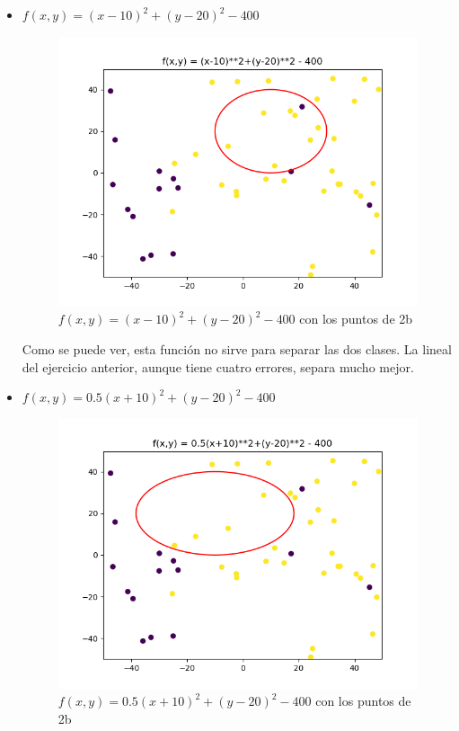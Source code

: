 \begin{itemize}
	\item $f(x,y) = (x-10)^2+(y-20)^2-400$
	
	\begin{figure}[H] %
		\centering
		\includegraphics[scale=0.5]{f1.png}  %
		\caption{$f(x,y) = (x-10)^2+(y-20)^2-400$ con los puntos de 2b} 
		\label{fig:f1}
	\end{figure}

Como se puede ver, esta función no sirve para separar las dos clases. La lineal del ejercicio anterior, aunque tiene cuatro errores, separa mucho mejor.

\item $f(x,y) = 0.5(x+10)^2+(y-20)^2-400$
\begin{figure}[H] %
	\centering
	\includegraphics[scale=0.5]{f2.png}  %
	\caption{$f(x,y) = 0.5(x+10)^2+(y-20)^2-400$ con los puntos de 2b} 
	\label{fig:f2}
\end{figure}


\end{itemize}
